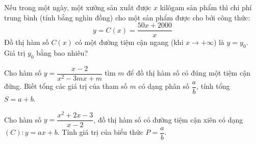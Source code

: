 \begin{ex}
\begin{ex}
    Nếu trong một ngày, một xưởng sản xuất được $x$ kilôgam sản phẩm thì chi phí trung bình (tính bằng nghìn đồng) cho một sản phẩm được cho bởi công thức:
    $$
    y=C(x)=\dfrac{50x+2000}{x}
    $$
    Đồ thị hàm số $C(x)$ có một đường tiệm cận ngang (khi $x \to +\infty$) là $y=y_0$. Giá trị $y_0$ bằng bao nhiêu?\\
\end{ex}

\begin{ex}%
    Cho hàm số $y=\dfrac{x-2}{x^2-3mx+m}$ tìm $m$ để đồ thị hàm số có đúng một tiệm cận đứng. Biết tổng các giá trị của tham số $m$ có dạng phân số $\dfrac{a}{b}$, tính tổng $S=a+b$.\\
\end{ex}

\begin{ex}%
    Cho hàm số $y=\dfrac{x^2+2x-3}{x-2}$, đồ thị hàm số có đường tiệm cận xiên có dạng $(C) \colon y=ax+b$. Tính giá trị của biểu thức $P=\dfrac{a}{b}$.\\
\end{ex}


\end{ex}
